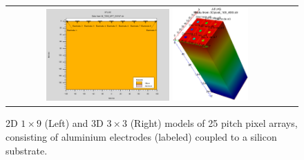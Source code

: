 \begin{figure}[!h]
  \begin{center}
    \begin{tabular}{cc}
      \includegraphics[width=0.45\textwidth]{fig_FastTiming/Materials.png}
      \includegraphics[width=0.275\textwidth]{fig_FastTiming/Model3D.png}
    \end{tabular}
    \caption{2D $1 \times 9$ (Left) and 3D $3 \times 3$ (Right) models of \SI{25}{\micron} pitch pixel arrays, consisting of aluminium electrodes (labeled) coupled to a silicon substrate.
            }
    \label{Materials_Model}
  \end{center}
\end{figure}

